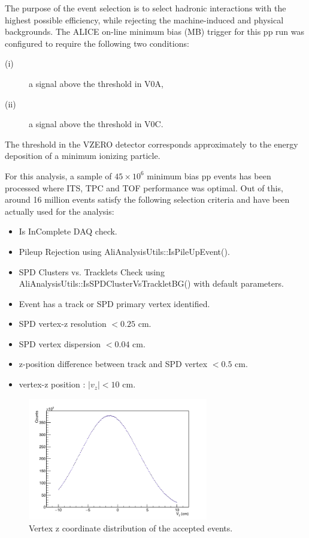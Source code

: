 The purpose of the event selection is to select hadronic interactions with the highest possible efficiency, while rejecting the machine-induced and physical backgrounds. The ALICE on-line minimum bias (MB) trigger for this pp run was configured to require the following two conditions: 

\begin{description}
\item[(i)] a signal above the threshold in V0A,
\item[(ii)] a signal above the threshold in V0C.
\end{description}


The threshold in the VZERO detector corresponds approximately to the energy deposition of a minimum ionizing particle. 


For this analysis, a sample of $45 \times 10^{6}$ minimum bias pp events has been processed where ITS, TPC and TOF performance was optimal. Out of this, around 16 million events satisfy the following selection criteria and have been actually used for the analysis:

\begin{itemize}
\item Is InComplete DAQ check.
\item Pileup Rejection using AliAnalysisUtils::IsPileUpEvent().
\item SPD Clusters vs. Tracklets Check using AliAnalysisUtils::IsSPDClusterVsTrackletBG() with default parameters.
\item Event has a track or SPD primary vertex identified.
\item SPD vertex-z resolution $< 0.25$ cm.
\item SPD vertex dispersion $< 0.04$ cm.
\item z-position difference between track and SPD vertex $< 0.5$ cm.
\item vertex-z position : $|v_{z}| < 10$ cm.
\end{itemize}



\begin{figure}[h!]
\centering
\includegraphics[width=0.7\textwidth]{Images/Chapter5/prim_vtx.png}
\caption{Vertex z coordinate distribution of the accepted events.} 
\label{Fig:chap5-5.2}
\end{figure} 


